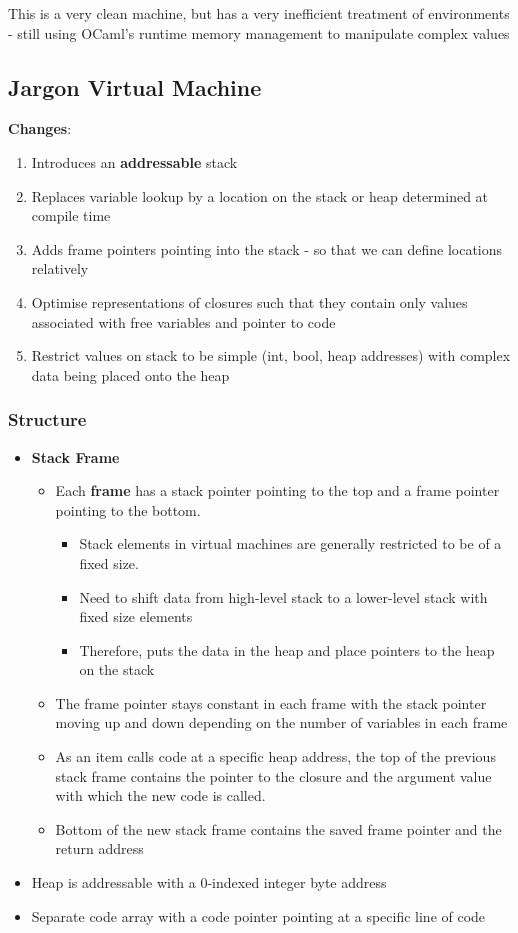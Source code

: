 \documentclass{article}
\begin{document}
This is a very clean machine, but has a very inefficient treatment of environments - still using OCaml's runtime memory management to manipulate complex values


\subsection{Jargon Virtual Machine}
\textbf{Changes}:
\begin{enumerate}
	\item Introduces an \textbf{addressable} stack
	\item Replaces variable lookup by a location on the stack or heap determined at compile time
	\item Adds frame pointers pointing into the stack - so that we can define locations relatively
	\item Optimise representations of closures such that they contain only values associated with free variables and pointer to code
	\item Restrict values on stack to be simple (int, bool, heap addresses) with complex data being placed onto the heap
\end{enumerate}

\bigskip
\noindent
\subsubsection{Structure}
\begin{itemize}
	\item \textbf{Stack Frame}
	\begin{itemize}
		\item Each \textbf{frame} has a stack pointer pointing to the top and a frame pointer pointing to the bottom.
		\begin{itemize}
			\item Stack elements in virtual machines are generally restricted to be of a fixed size.
			\item Need to shift data from high-level stack to a lower-level stack with fixed size elements
			\item Therefore, puts the data in the heap and place pointers to the heap on the stack
		\end{itemize}
		\item The frame pointer stays constant in each frame with the stack pointer moving up and down depending on the number of variables in each frame
		\item As an item calls code at a specific heap address, the top of the previous stack frame contains the pointer to the closure and the argument value with which the new code is called. 
		\item Bottom of the new stack frame contains the saved frame pointer and the return address
	\end{itemize}
	
	\item Heap is addressable with a 0-indexed integer byte address
	
	\item Separate code array with a code pointer pointing at a specific line of code
\end{itemize}
\end{document}
